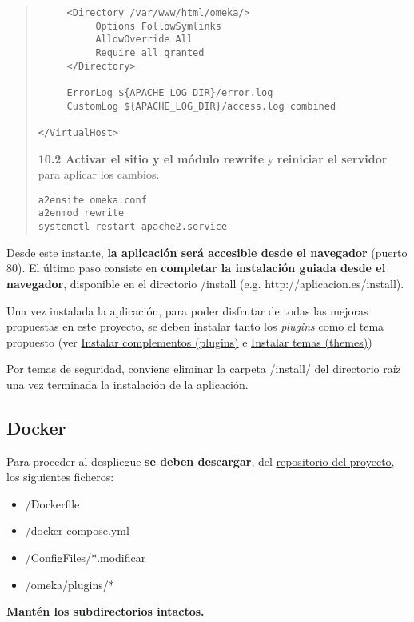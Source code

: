 \begin{enumerate}
\begin{quote}
\begin{verbatim}
     <Directory /var/www/html/omeka/>
          Options FollowSymlinks
          AllowOverride All
          Require all granted
     </Directory>

     ErrorLog ${APACHE_LOG_DIR}/error.log
     CustomLog ${APACHE_LOG_DIR}/access.log combined

</VirtualHost>
\end{verbatim}
\item
  \textbf{10.2 Activar el sitio y el módulo rewrite} y \textbf{reiniciar el
  servidor} para aplicar los cambios.
\begin{verbatim}
a2ensite omeka.conf
a2enmod rewrite
systemctl restart apache2.service
\end{verbatim}
\end{quote}
\end{enumerate}

Desde este instante, \textbf{la aplicación será accesible desde el
navegador} (puerto 80). El último paso consiste en \textbf{completar la
instalación guiada desde el navegador}, disponible en el directorio
{/install} (e.g. {http://aplicacion.es/install}).

Una vez instalada la aplicación, para poder disfrutar de todas las
mejoras propuestas en este proyecto, se deben instalar tanto los
\emph{plugins} como el tema propuesto (ver
\protect\hyperlink{instalar-complementos-plugins}{Instalar complementos
(plugins)} e \protect\hyperlink{instalar-temas-themes}{Instalar temas
(themes)})

Por temas de seguridad, conviene eliminar la carpeta {/install/} del
directorio raíz una vez terminada la instalación de la aplicación.

\subsection{Docker}

Para proceder al despliegue \textbf{se deben descargar}, del
\href{https://github.com/gcm1001/TFG-CeniehAriadne}{repositorio del
proyecto}, los siguientes ficheros:

\begin{itemize}
\tightlist
\item
  {/Dockerfile}
\item
  {/docker-compose.yml}
\item
  {/ConfigFiles/*.modificar}
\item
  {/omeka/plugins/*}
\end{itemize}

\textbf{Mantén los subdirectorios intactos.}

